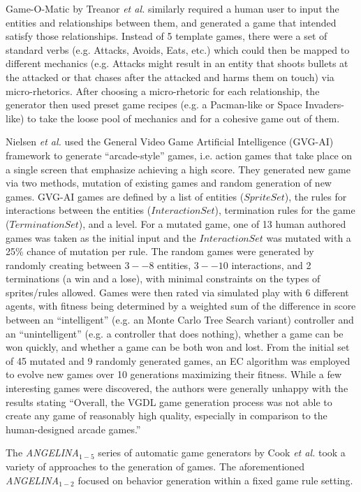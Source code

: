 \documentclass[12pt]{report}
\begin{document}
Game-O-Matic by Treanor \textit{et al.} \cite{treanor2012game} similarly required a human user to input the entities and relationships between them, and generated a game that intended satisfy those relationships.  Instead of 5 template games, there were a set of standard verbs (e.g. Attacks, Avoids, Eats, etc.) which could then be mapped to different mechanics (e.g. Attacks might result in an entity that shoots bullets at the attacked or that chases after the attacked and harms them on touch) via micro-rhetorics. After choosing a micro-rhetoric for each relationship, the generator then used preset game recipes (e.g. a Pacman-like or Space Invaders-like) to take the loose pool of mechanics and for a cohesive game out of them. 

Nielsen \textit{et al.} \cite{nielsen2015towards} used the General Video Game Artificial Intelligence (GVG-AI) framework to generate ``arcade-style'' games, i.e. action games that take place on a single screen that emphasize achieving a high score.  They generated new game via two methods, mutation of existing games and random generation of new games.  GVG-AI games are defined by a list of entities ($SpriteSet$), the rules for interactions between the entities ($InteractionSet$), termination rules for the game ($TerminationSet$), and a level.  For a mutated game, one of 13 human authored games was taken as the initial input and the $InteractionSet$ was mutated with a 25\% chance of mutation per rule.  The random games were generated by randomly creating between $3 -- 8$ entities, $3 -- 10$ interactions, and 2 terminations (a win and a lose), with minimal constraints on the types of sprites/rules allowed.  Games were then rated via simulated play with 6 different agents, with fitness being determined by a weighted sum of the difference in score between an ``intelligent'' (e.g. an Monte Carlo Tree Search variant) controller and an ``unintelligent'' (e.g. a controller that does nothing), whether a game can be won quickly, and whether a game can be both won and lost.  From the initial set of 45 mutated and  9 randomly generated games, an EC algorithm was employed to evolve new games over 10 generations maximizing their fitness. While a few interesting games were discovered, the authors were generally unhappy with the results stating ``Overall, the VGDL game generation process was not able to create any game of reasonably high quality, especially in comparison to the human-designed arcade games.''

The \textit{ANGELINA}$_{1-5}$ series of automatic game generators by Cook \textit{et al.} \cite{cook2015co} took a variety of approaches to the generation of games.  The aforementioned \textit{ANGELINA}$_{1-2}$ focused on behavior generation within a fixed game rule setting.
\end{document}
